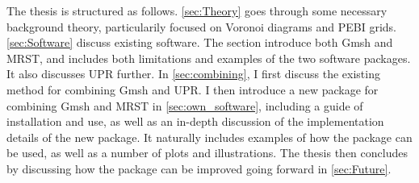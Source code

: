 The thesis is structured as follows. \autoref{sec:Theory} goes through some necessary background theory, particularily focused on Voronoi diagrams and PEBI grids. \autoref{sec:Software} discuss existing software. The section introduce both Gmsh and MRST, and includes both limitations and examples of the two software packages. It also discusses UPR further. In \autoref{sec:combining}, I first discuss the existing method for combining Gmsh and UPR. I then introduce a new package for combining Gmsh and MRST in \autoref{sec:own_software}, including a guide of installation and use, as well as an in-depth discussion of the implementation details of the new package. It naturally includes examples of how the package can be used, as well as a number of plots and illustrations. The thesis then concludes by discussing how the package can be improved going forward in \autoref{sec:Future}.